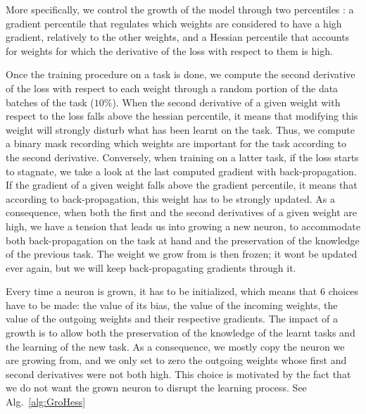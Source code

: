 \documentclass[11pt]{article}
\begin{document}
More specifically, we control the growth of the model through two percentiles : a gradient percentile that regulates which weights are considered to have a high gradient, relatively to the other weights, and a Hessian percentile that accounts for weights for which the derivative of the loss with respect to them is high.

\vspace{2mm}
\noindent
Once the training procedure on a task is done, we compute the second derivative of the loss with respect to each weight through a random portion of the data batches of the task ($10\%$). When the second derivative of a given weight with respect to the loss falls above the hessian percentile, it means that modifying this weight will strongly disturb what has been learnt on the task. Thus, we compute a binary mask recording which weights are important for the task according to the second derivative. Conversely, when training on a latter task, if the loss starts to stagnate, we take a look at the last computed gradient with back-propagation. If the gradient of a given weight falls above the gradient percentile, it means that according to back-propagation, this weight has to be strongly updated. As a consequence, when both the first and the second derivatives of a given weight are high, we have a tension that leads us into growing a new neuron, to accommodate both back-propagation on the task at hand and the preservation of the knowledge of the previous task. The weight we grow from is then frozen; it wont be updated ever again, but we will keep back-propagating gradients through it.

\vspace{2mm}
\noindent
Every time a neuron is grown, it has to be initialized, which means that 6 choices have to be made: the value of its bias, the value of the incoming weights, the value of the outgoing weights and their respective gradients. The impact of a growth is to allow both the preservation of the knowledge of the learnt tasks and the learning of the new task. As a consequence, we mostly copy the neuron we are growing from, and we only set to zero the outgoing weights whose first and second derivatives were not both high. This choice is motivated by the fact that we do not want the grown neuron to disrupt the learning process. See Alg.~\ref{alg:GroHess}
\end{document}
